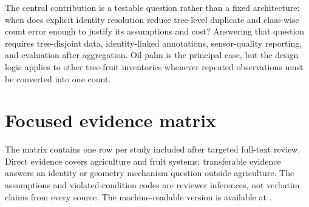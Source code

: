 The central contribution is a testable question rather than a fixed architecture: when does explicit identity resolution reduce tree-level duplicate and class-wise count error enough to justify its assumptions and cost? Answering that question requires tree-disjoint data, identity-linked annotations, sensor-quality reporting, and evaluation after aggregation. Oil palm is the principal case, but the design logic applies to other tree-fruit inventories whenever repeated observations must be converted into one count.

\appendix

\section{Focused evidence matrix}
\label{app:matrix3}

The matrix contains one row per study included after targeted full-text review. Direct evidence covers agriculture and fruit systems; transferable evidence answers an identity or geometry mechanism question outside agriculture. The assumptions and violated-condition codes are reviewer inferences, not verbatim claims from every source. The machine-readable version is available at .


